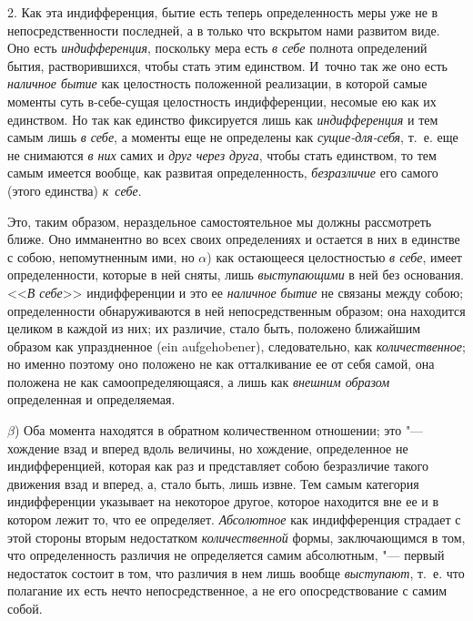 2. Как эта индифференция, бытие есть теперь определенность меры уже не в
непосредственности последней, а в только что вскрытом нами развитом виде.
Оно есть {\em индифференция}, поскольку мера есть
{\em в себе} полнота определений бытия, растворившихся,
чтобы стать этим единством. И~точно так же оно есть
{\em наличное бытие} как целостность положенной
реализации, в которой самые моменты суть в-себе-сущая целостность
индифференции, несомые ею как их единством. Но так как единство фиксируется
лишь как {\em индифференция} и тем самым лишь
{\em в себе}, а моменты еще не определены как
{\em сущие-для-себя}, т.~е. еще не снимаются
{\em в них} самих и {\em друг через
друга}, чтобы стать единством, то тем самым имеется вообще, как развитая
определенность, {\em безразличие} его самого (этого единства) {\em к~себе}.

Это, таким образом, нераздельное самостоятельное мы должны рассмотреть
ближе. Оно имманентно во всех своих определениях и остается в них в
единстве с собою, непомутненным ими, но $\alpha$)
как остающееся целостностью {\em в себе}, имеет
определенности, которые в ней сняты, лишь
{\em выступающими} в ней без основания.
<<{\em В себе}>> индифференции и это ее
{\em наличное бытие} не связаны между собою;
определенности обнаруживаются в ней непосредственным образом; она находится
целиком в каждой из них; их различие, стало быть, положено ближайшим
образом как упраздненное (ein aufgehobener), следовательно, как
{\em количественное}; но именно поэтому оно положено не
как отталкивание ее от себя самой, она положена не как самоопределяющаяся,
а лишь как {\em внешним образом} определенная и определяемая.

$\beta $) Оба момента находятся в обратном
количественном отношении; это "--- хождение взад и вперед вдоль величины, но
хождение, определенное не индифференцией, которая как раз и представляет
собою безразличие такого движения взад и вперед, а, стало быть, лишь извне.
Тем самым категория индифференции указывает на некоторое другое, которое
находится вне ее и в котором лежит то, что ее определяет.
{\em Абсолютное} как индифференция страдает с этой
стороны вторым недостатком {\em количественной} формы,
заключающимся в том, что определенность различия не определяется самим
абсолютным, "--- первый недостаток состоит в том, что различия в нем лишь
вообще {\em выступают}, т.~е. что полагание их есть
нечто непосредственное, а не его опосредствование с самим собой.

